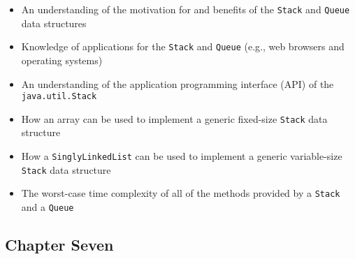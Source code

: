 \documentclass[11pt]{article}
\newcommand{\program}[1]{\lstinline{#1}}
\begin{document}
\begin{itemize}

  \item An understanding of the motivation for and benefits of the
    \program{Stack} and \program{Queue} data structures

  \item Knowledge of applications for the \program{Stack} and \program{Queue}
    (e.g., web browsers and operating systems)

  \item An understanding of the application programming interface (API) of the
    \program{java.util.Stack}

  \item How an array can be used to implement a generic fixed-size
    \program{Stack} data structure

  \item How a \program{SinglyLinkedList} can be used to implement a generic
    variable-size \program{Stack} data structure

  \item The worst-case time complexity of all of the methods provided by a
    \program{Stack} and a \program{Queue}

\end{itemize}

\vspace*{-.2in}
\subsection*{Chapter Seven}
\end{document}
